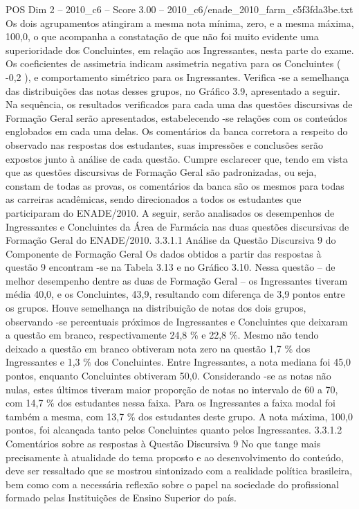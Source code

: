 \begin{textsample}{POS Dim 2 – 2010\_c6 – Score 3.00 – 2010\_c6/enade\_2010\_farm\_c5f3fda3be.txt}
Os dois agrupamentos atingiram a mesma nota mínima, zero, e a mesma máxima, 100,0, o que acompanha a constatação de que não foi muito evidente uma superioridade dos Concluintes, em relação aos Ingressantes, nesta parte do exame.
Os coeficientes de assimetria indicam assimetria negativa para os Concluintes ( -0,2 ), e comportamento simétrico para os Ingressantes.
Verifica -se a semelhança das distribuições das notas desses grupos, no Gráfico 3.9, apresentado a seguir.
Na sequência, os resultados verificados para cada uma das questões discursivas de Formação Geral serão apresentados, estabelecendo -se relações com os conteúdos englobados em cada uma delas.
Os comentários da banca corretora a respeito do observado nas respostas dos estudantes, suas impressões e conclusões serão expostos junto à análise de cada questão.
Cumpre esclarecer que, tendo em vista que as questões discursivas de Formação Geral são padronizadas, ou seja, constam de todas as provas, os comentários da banca são os mesmos para todas as carreiras acadêmicas, sendo direcionados a todos os estudantes que participaram do ENADE/2010.
A seguir, serão analisados os desempenhos de Ingressantes e Concluintes da Área de Farmácia nas duas questões discursivas de Formação Geral do ENADE/2010. 3.3.1.1 Análise da Questão Discursiva 9 do Componente de Formação Geral Os dados obtidos a partir das respostas à questão 9 encontram -se na Tabela 3.13 e no Gráfico 3.10.
Nessa questão – de melhor desempenho dentre as duas de Formação Geral – os Ingressantes tiveram média 40,0, e os Concluintes, 43,9, resultando com diferença de 3,9 pontos entre os grupos.
Houve semelhança na distribuição de notas dos dois grupos, observando -se percentuais próximos de Ingressantes e Concluintes que deixaram a questão em branco, respectivamente 24,8 \% e 22,8 \%.
Mesmo não tendo deixado a questão em branco obtiveram nota zero na questão 1,7 \% dos Ingressantes e 1,3 \% dos Concluintes.
Entre Ingressantes, a nota mediana foi 45,0 pontos, enquanto Concluintes obtiveram 50,0.
Considerando -se as notas não nulas, estes últimos tiveram maior proporção de notas no intervalo de 60 a 70, com 14,7 \% dos estudantes nessa faixa.
Para os Ingressantes a faixa modal foi também a mesma, com 13,7 \% dos estudantes deste grupo.
A nota máxima, 100,0 pontos, foi alcançada tanto pelos Concluintes quanto pelos Ingressantes. 3.3.1.2 Comentários sobre as respostas à Questão Discursiva 9 No que tange mais precisamente à atualidade do tema proposto e ao desenvolvimento do conteúdo, deve ser ressaltado que se mostrou sintonizado com a realidade política brasileira, bem como com a necessária reflexão sobre o papel na sociedade do profissional formado pelas Instituições de Ensino Superior do país.

\end{textsample}
